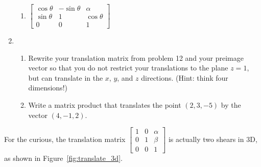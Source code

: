 \documentclass[../gatm.tex]{subfiles}
\begin{document}
\begin{enumerate}
\begin{multicols}{2}
\begin{enumerate}
\item $\left[\begin{array}{ccc} \cos\theta & -\sin\theta & \alpha \\ \sin\theta & 1 & \cos\theta \\ 0 & 0 & 1 \end{array}\right]$
\end{enumerate}
\end{multicols}
\item \begin{enumerate}
\item Rewrite your translation matrix from problem 12 and your preimage vector so that you do not restrict your translations to the plane $z=1$, but can translate in the $x$, $y$, and $z$ directions. (Hint: think four dimensions!)
\item Write a matrix product that translates the point $(2,3,-5)$ by the vector $(4,-1,2)$.
\end{enumerate}
\end{enumerate}

For the curious, the translation matrix $\left[\begin{array}{ccc} 1 & 0 & \alpha \\ 0 & 1 & \beta \\ 0 & 0 & 1 \end{array}\right]$ is actually two shears in 3D, as shown in Figure~\ref{fig:translate_3d}.
\end{document}
